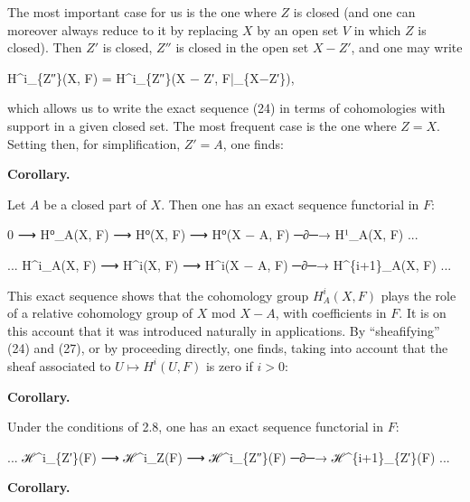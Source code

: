 \documentclass[
]{article}
\newenvironment{Shaded}{}{}
\newcommand{\NormalTok}[1]{#1}
\begin{document}
The most important case for us is the one where \(Z\) is closed (and one
can moreover always reduce to it by replacing \(X\) by an open set \(V\)
in which \(Z\) is closed). Then \(Z'\) is closed, \(Z''\) is closed in
the open set \(X - Z'\), and one may write

\begin{Shaded}
\begin{Highlighting}[]
\NormalTok{H\^{}i\_\{Z″\}(X, F) = H\^{}i\_\{Z″\}(X − Z′, F|\_\{X−Z′\}),}
\end{Highlighting}
\end{Shaded}

which allows us to write the exact sequence (24) in terms of
cohomologies with support in a given closed set. The most frequent case
is the one where \(Z = X\). Setting then, for simplification,
\(Z' = A\), one finds:

\textbf{Corollary.}

Let \(A\) be a closed part of \(X\). Then one has an exact sequence
functorial in \(F\):

\begin{Shaded}
\begin{Highlighting}[]
\NormalTok{0 ⟶ H⁰\_A(X, F) ⟶ H⁰(X, F) ⟶ H⁰(X − A, F) ─∂─→ H¹\_A(X, F) ...}

\NormalTok{... H\^{}i\_A(X, F) ⟶ H\^{}i(X, F) ⟶ H\^{}i(X − A, F) ─∂─→ H\^{}\{i+1\}\_A(X, F) ...}
\end{Highlighting}
\end{Shaded}

This exact sequence shows that the cohomology group \(H^{i}_{A}(X, F)\)
plays the role of a relative cohomology group of \(X\) mod \(X - A\),
with coefficients in \(F\). It is on this account that it was introduced
naturally in applications. By ``sheafifying'' (24) and (27), or by
proceeding directly, one finds, taking into account that the sheaf
associated to \(U \mapsto H^{i}(U, F)\) is zero if \(i > 0\):

\textbf{Corollary.}

Under the conditions of 2.8, one has an exact sequence functorial in
\(F\):

\begin{Shaded}
\begin{Highlighting}[]
\NormalTok{... ℋ\^{}i\_\{Z′\}(F) ⟶ ℋ\^{}i\_Z(F) ⟶ ℋ\^{}i\_\{Z″\}(F) ─∂─→ ℋ\^{}\{i+1\}\_\{Z′\}(F) ...}
\end{Highlighting}
\end{Shaded}

\textbf{Corollary.}
\end{document}
